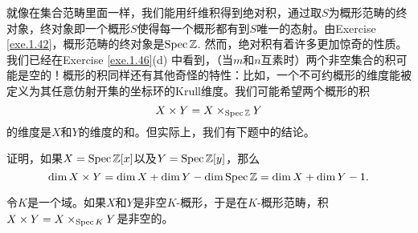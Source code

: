 就像在集合范畴里面一样，我们能用纤维积得到绝对积，通过取$S$为概形范畴的终对象，终对象即一个概形$S$使得每一个概形都有到$S$唯一的态射。由Exercise \ref{exe.1.42}，概形范畴的终对象是$\operatorname{Spec} \mathbb{Z}$. 然而，绝对积有着许多更加惊奇的性质。我们已经在Exercise \ref{exe.1.46}(d) 中看到，（当$m$和$n$互素时）两个非空集合的积可能是空的！概形的积同样还有其他奇怪的特性：比如，一个不可约概形的维度能被定义为其任意仿射开集的坐标环的Krull维度。我们可能希望两个概形的积
\[
	X\times Y=X\times_{\operatorname{Spec} \mathbb{Z}} Y
\]
的维度是$X$和$Y$的维度的和。但实际上，我们有下题中的结论。

\begin{exe}
证明，如果$X=\operatorname{Spec} \mathbb{Z}[x]$以及$Y=\operatorname{Spec} \mathbb{Z}[y]$，那么
\[
	\dim X\times Y=\dim X+\dim Y-\dim \operatorname{Spec} \mathbb{Z}=\dim X+\dim Y-1.
\]
\end{exe}

\begin{exe}
令$K$是一个域。如果$X$和$Y$是非空$K$\hyp 概形，于是在$K$\hyp 概形范畴，积$X\times Y=X\times_{\operatorname{Spec} K}Y$是非空的。
\end{exe}